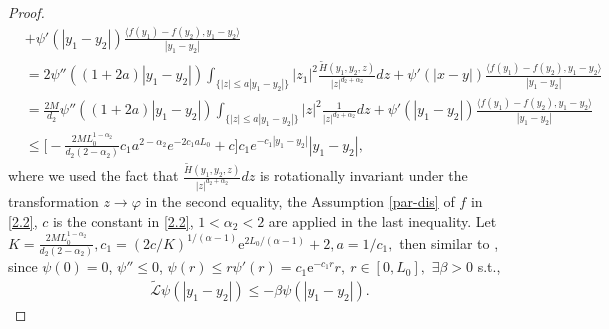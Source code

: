 \documentclass[11pt,reqno]{amsart}
\numberwithin{equation}{section}
\newcommand{\al}{\alpha}
\begin{document}
\begin{proof}
\begin{align}
&+\psi'(|y_1-y_2|) \frac{\langle f(y_1)-f(y_2),y_1-y_2\rangle }{|y_1-y_2|}\nonumber\\
&= 2\psi''((1+2a)|y_1-y_2|)\int
_{\{|z|\le a{|y_1-y_2|} \}}{|z_1|^2}\frac{\widetilde{H}(y_1,y_2,z)}{|z|^{d_2+\alpha_2}}dz+\psi'(|x-y|) \frac{\langle f(y_1)-f(y_2),y_1-y_2\rangle }{|y_1-y_2|}\nonumber\\
&= \frac{2M}{d_2}\psi''((1+2a)|y_1-y_2|)
\int_{ \{|z|\le a{|y_1-y_2|} \}}{|z|^2}\frac{1}{|z|^{d_2+\alpha_2}} dz+\psi'(|y_1-y_2|)\frac{\langle f(y_1)-f(y_2),y_1-y_2\rangle }{|y_1-y_2|}\nonumber\\
&\leq \biggl[-\frac{2M L_0^{1-\alpha_2}}{d_2(2-\alpha_2)}c_1a^{2-\alpha_2}e^{-2c_1a L_0}+c \biggr] c_1e^{-c_1|y_1-y_2|}|y_1-y_2|,\label{psi}
\end{align}
where we used the fact that $\frac{\widetilde{H}(y_1,y_2,z)}{|z|^{d_2+\alpha_2}}dz$ is  rotationally invariant under the transformation $z\rightarrow\varphi$ in the second equality, the Assumption \ref{par-dis} of $f$ in \eqref{2.2}, $c$ is the constant in \eqref{2.2}, $ 1<\al_{2}<2$ are applied in the last inequality.  Let $K=\frac{2M L_0^{1-\alpha_2}}{d_2(2-\alpha_2)}, c_1=(2c/K)^{1/(\alpha-1)}
\mathrm{e}^{2L_0/(\alpha-1)}+2,  a=1/c_1,$ then similar to \cite[Proposition 3.1]{JW2},
since $\psi(0)=0$, $\psi''\leq0$,
$\psi(r)\leq r\psi'(r)= c_1\mathrm{e}^{-c_1 r} r,\ r
\in[0,L_0],$  $\exists\beta>0$ s.t.,
\begin{align*}
	\widetilde{\mathcal{L}}\psi(|y_1-y_2|)\leq-\beta \psi(|y_1-y_2|).
\end{align*}




\end{proof}
\end{document}
